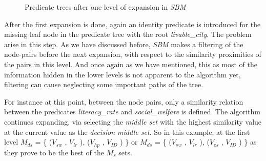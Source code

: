 \begin{figure}[h!]
\begin{center}
\end{center}
\caption{Predicate trees after one level of expansion in \textit{SBM}}
\label{fig:res2}
\end{figure}

After the first expansion is done, again an identity predicate is introduced for the missing leaf node in the predicate tree with the root \textit{livable\_city}. The problem arise in this step. As we have discussed before, \textit{SBM} makes a filtering of the node-pairs before the next expansion, with respect to the similarity proximities of the pairs in this level. And once again as we have mentioned, this as most of the information hidden in the lower levels is not apparent to the algorithm yet, filtering can cause neglecting some important paths of the tree.

For instance at this point, between the node pairs, only a similarity relation between the predicates \textit{literacy\_rate} and \textit{social\_welfare} is defined. The algorithm continues expanding, via selecting the \textit{middle set} with the highest similarity value at the current value as the \textit{decision middle set}. So in this example, at the first level \textit{$M_{ds}$} = \{ (\textit{$V_{sw }$} , \textit{$V_{lr}$} ), (\textit{$V_{hp }$} , \textit{$V_{ID}$} ) \}  or \textit{$M_{ds}$} = \{ (\textit{$V_{sw }$} , \textit{$V_{lr}$} ), (\textit{$V_{es }$} , \textit{$V_{ID}$} ) \}  as they prove to be the best of the \textit{$M_{s}$} sets.


